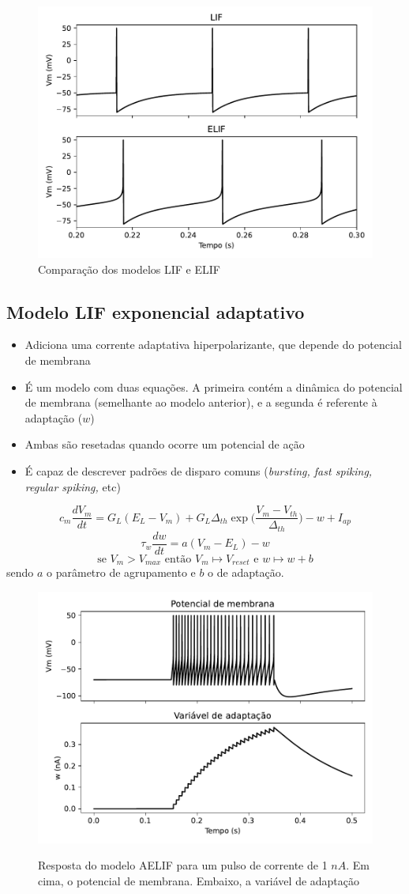 \begin{figure}[htb!]
	\centering
	\caption{Comparação dos modelos LIF e ELIF}
	\label{fig:elif}
	\includegraphics[width=0.7\linewidth]{figs/elif}
\end{figure}


\subsection{Modelo LIF exponencial adaptativo}
\begin{itemize}
	\item Adiciona uma corrente adaptativa hiperpolarizante, que depende do potencial de membrana
	\item É um modelo com duas equações. A primeira contém a dinâmica do potencial de membrana (semelhante ao modelo anterior), e a segunda é referente à adaptação ($w$)
	\item Ambas são resetadas quando ocorre um potencial de ação
	\item É capaz de descrever padrões de disparo comuns (\textit{bursting, fast spiking, regular spiking,} etc)
\end{itemize}
$$
c_m\frac{dV_m}{dt} = G_L(E_L-V_m) + G_L\Delta_{th}\exp\Big(\frac{V_m-V_{th}}{\Delta_{th}}\Big) - w + I_{ap}
$$$$
\tau_w\frac{dw}{dt}=a(V_m-E_L)-w
$$$$
\text{se } V_m > V_{max} \text{ então } V_m\mapsto V_{reset} \text{ e } w\mapsto w + b
$$
sendo $a$ o parâmetro de agrupamento e $b$ o de adaptação.

\begin{figure}[h!]
	\centering
	\caption{Resposta do modelo AELIF para um pulso de corrente de 1 $nA$. Em cima, o potencial de membrana. Embaixo, a variável de adaptação}
	\label{fig:adexrs}
	\includegraphics[width=0.7\linewidth]{figs/aelif}\\
\end{figure}


